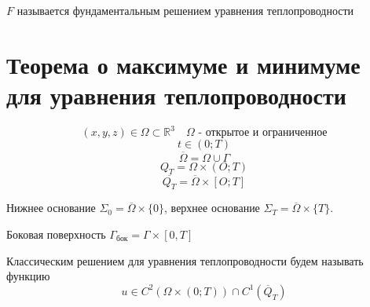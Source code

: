 \documentclass[a4paper]{article}
\theoremstyle{definition}
\theoremstyle{remark}
\begin{document}
$ F $ называется фундаментальным решением уравнения теплопроводности

\section*{Теорема о максимуме и минимуме для уравнения теплопроводности}
\[
    (x,y,z) \in \Omega \subset \mathbb{R}^3 \quad \Omega \text{ - открытое и ограниченное}
\]
\[
    t \in (0; T)
\]
\[
    \overline{\Omega} = \Omega \cup \Gamma
\]
\[
    Q_T = \Omega \times (O;T)
\]
\[
    \overline{Q_T} = \overline{\Omega} \times [O;T]
\]

Нижнее основание $ \Sigma_0 = \overline{\Omega} \times \{ 0 \} $, верхнее основание
$ \Sigma_T = \overline{\Omega} \times \{ T \} $.

Боковая поверхность $ \Gamma_{\text{бок}} = \Gamma \times [0,T] $ 

Классическим решением для уравнения теплопроводности будем называть функцию
\[
    u \in C^2(\Omega \times (0;T)) \cap C^{1}(\overline{Q}_T)
\]

\newpage
\end{document}
